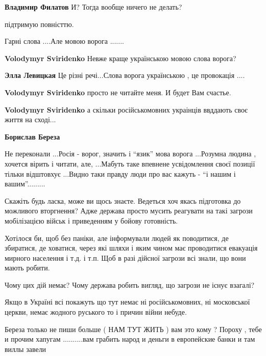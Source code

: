 \begin{itemize}
\textbf{Владимир Филатов} И? Тогда вообще ничего не делать?

підтримую повністтю.

Гарні слова ....Але мовою ворога .......

\begin{itemize} %
\textbf{Volodymyr Sviridenko} Невже краще українською мовою слова ворога?

\textbf{Элла Левицкая} Це різні речі...Слова ворога українською , це провокація ....

\textbf{Volodymyr Sviridenko} просто не читайте меня. И будет Вам счастье.

\textbf{Volodymyr Sviridenko} а скільки російськомовних украінців ввддають своє життя на сході...

\textbf{Борислав Береза} 

Не переконали ...Росія - ворог, значить і \enquote{язик} мова ворога ...Розумна людина
, хочется вірить і читати, але, ...Мабуть таке впевнене усвідомлення своєї
позиції тільки відштовхує ...Видно таки правду люди про вас кажуть - \enquote{і нашим і
вашим}.........

\end{itemize} %


Скажіть будь ласка, може ви щось знаєте. Ведеться хоч якась підготовка до
можливого вторгнення? Адже держава просто мусить реагувати на такі загрози
мобілізацією військ і приведенням у бойову готовність.

Хотілося би, щоб без паніки, але інформували людей як поводитися, де збиратися,
де ховатися, через які шляхи і яким чином має проводитися евакуація мирного
населення і т.д. і т.п. Щоб в разі дійсної загрози всі знали, що вони мають
робити.

Чому цих дій немає? Чому держава робить вигляд, що загрози не існує взагалі?


Якщо в Україні всі покажуть що тут немає ні російськомовних, ні московської
церкви, немає жодного руського то і причин війни небуде.


Береза только не пиши больше ( НАМ ТУТ ЖИТЬ ) вам это кому ? Пороху , тебе и
прочим хапугам ..........вам грабить народ и деньги в европейские банки и там
виллы завели


\end{itemize}
